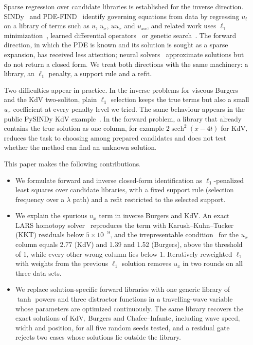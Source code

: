 \documentclass{article}
\newcommand{\sech}{\operatorname{sech}}
\begin{document}
Sparse regression over candidate libraries is established for the inverse direction. SINDy~\citep{brunton2016sindy} and PDE-FIND~\citep{rudy2017pdefind} identify governing equations from data by regressing $u_t$ on a library of terms such as $u$, $u_x$, $u u_x$ and $u_{xx}$, and related work uses $\ell_1$ minimization~\citep{schaeffer2017learning}, learned differential operators~\citep{long2018pdenet,both2019deepmod} or genetic search~\citep{xu2020dlga,chen2021sga}. The forward direction, in which the PDE is known and its solution is sought as a sparse expansion, has received less attention; neural solvers~\citep{raissi2019pinn,weinan2017deepritz} approximate solutions but do not return a closed form. We treat both directions with the same machinery: a library, an $\ell_1$ penalty, a support rule and a refit.

Two difficulties appear in practice. In the inverse problems for viscous Burgers and the KdV two-soliton, plain $\ell_1$ selection keeps the true terms but also a small $u_x$ coefficient at every penalty level we tried. The same behaviour appears in the public PySINDy KdV example~\citep{desilva2020pysindy}. In the forward problem, a library that already contains the true solution as one column, for example $2\sech^2(x-4t)$ for KdV, reduces the task to choosing among prepared candidates and does not test whether the method can find an unknown solution.

This paper makes the following contributions.
\begin{itemize}
\item We formulate forward and inverse closed-form identification as $\ell_1$-penalized least squares over candidate libraries, with a fixed support rule (selection frequency over a $\lambda$ path) and a refit restricted to the selected support.
\item We explain the spurious $u_x$ term in inverse Burgers and KdV. An exact LARS homotopy solver~\citep{efron2004lars} reproduces the term with Karush--Kuhn--Tucker (KKT) residuals below $5\times 10^{-9}$, and the irrepresentable condition~\citep{zhao2006consistency} for the $u_x$ column equals 2.77 (KdV) and 1.39 and 1.52 (Burgers), above the threshold of 1, while every other wrong column lies below 1. Iteratively reweighted $\ell_1$~\citep{candes2008irl1} with weights from the previous $\ell_1$ solution removes $u_x$ in two rounds on all three data sets.
\item We replace solution-specific forward libraries with one generic library of $\tanh$ powers and three distractor functions in a travelling-wave variable whose parameters are optimized continuously. The same library recovers the exact solutions of KdV, Burgers and Chafee--Infante, including wave speed, width and position, for all five random seeds tested, and a residual gate rejects two cases whose solutions lie outside the library.
\end{itemize}
\end{document}
